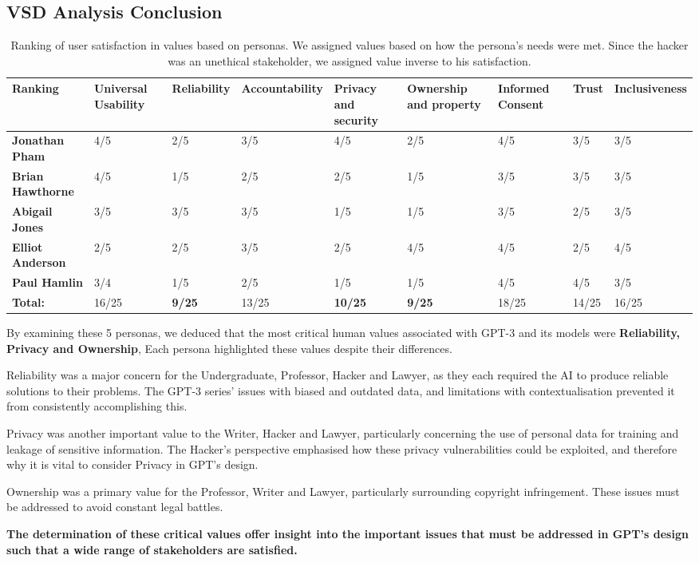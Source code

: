 \subsection{VSD Analysis Conclusion}

\begin{table}[htbp]
\centering
\begin{tabularx}{\textwidth}{|X|X|X|X|X|X|X|X|X|}
\hline
\textbf{Ranking} & \textbf{Universal Usability} & \textbf{Reliability} & \textbf{Accountability} & \textbf{Privacy and security} & \textbf{Ownership and property} & \textbf{Informed Consent} & \textbf{Trust} & \textbf{Inclusiveness} \\
\hline
\textbf{Jonathan Pham} & 4/5 & 2/5 & 3/5 & 4/5 & 2/5 & 4/5 & 3/5 & 3/5 \\
\hline
\textbf{Brian Hawthorne} & 4/5 & 1/5 & 2/5 & 2/5 & 1/5 & 3/5 & 3/5 & 3/5 \\
\hline
\textbf{Abigail Jones} & 3/5 & 3/5 & 3/5 & 1/5 & 1/5 & 3/5 & 2/5 & 3/5 \\
\hline
\textbf{Elliot Anderson} & 2/5 & 2/5 & 3/5 & 2/5 & 4/5 & 4/5 & 2/5 & 4/5 \\
\hline
\textbf{Paul Hamlin} & 3/4 & 1/5 & 2/5 & 1/5 & 1/5 & 4/5 & 4/5 & 3/5 \\
\hline
\textbf{Total:} & 16/25 & \textbf{9/25} & 13/25 & \textbf{10/25} & \textbf{9/25} & 18/25 & 14/25 & 16/25 \\
\hline
\end{tabularx}
\caption{Ranking of user satisfaction in values based on personas. We assigned values based on how the persona's needs were met. Since the hacker was an unethical stakeholder, we assigned value inverse to his satisfaction.}
\label{tab:valueranking}
\end{table}

By examining these 5 personas, we deduced that the most critical human values associated with GPT-3 and its models were \textbf{Reliability, Privacy and Ownership}, Each persona highlighted these values despite their differences.

Reliability was a major concern for the Undergraduate, Professor, Hacker and Lawyer, as they each required the AI to produce reliable solutions to their problems. The GPT-3 series’ issues with biased and outdated data, and limitations with contextualisation prevented it from consistently accomplishing this.

Privacy was another important value to the Writer, Hacker and Lawyer, particularly concerning the use of personal data for training and leakage of sensitive information. The Hacker’s perspective emphasised how these privacy vulnerabilities could be exploited, and therefore why it is vital to consider Privacy in GPT’s design.

Ownership was a primary value for the Professor, Writer and Lawyer, particularly surrounding copyright infringement. These issues must be addressed to avoid constant legal battles.

\textbf{The determination of these critical values offer insight into the important issues that must be addressed in GPT’s design such that a wide range of stakeholders are satisfied.}



